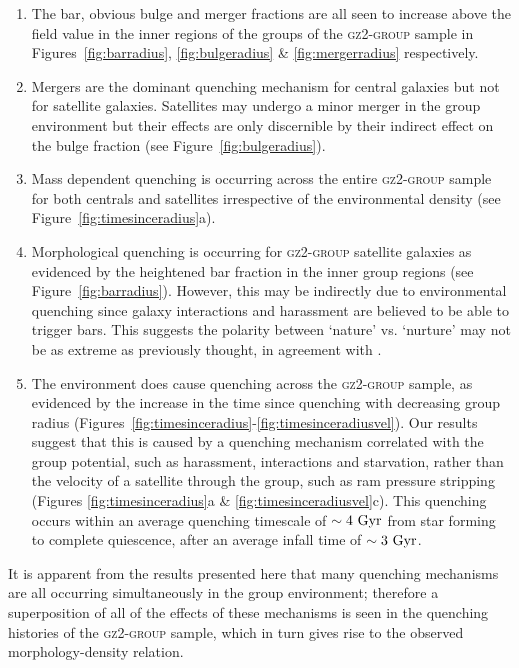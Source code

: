 \documentclass[useAMS,usenatbib]{mn2e}
\begin{document}
\begin{enumerate}
\item The bar, obvious bulge and merger fractions are all seen to increase above the field value in the inner regions of the groups of the \textsc{gz2-group} sample in Figures~\ref{fig:barradius}, \ref{fig:bulgeradius} \& \ref{fig:mergerradius} respectively.  
 
\item Mergers are the dominant quenching mechanism for central galaxies but not for satellite galaxies. Satellites may undergo a minor merger in the group environment but their effects are only discernible by their indirect effect on the bulge fraction (see Figure~\ref{fig:bulgeradius}).
 
\item Mass dependent quenching is occurring across the entire \textsc{gz2-group} sample for both centrals and satellites irrespective of the environmental density (see Figure~\ref{fig:timesinceradius}a).
 
\item Morphological quenching is occurring for \textsc{gz2-group} satellite galaxies as evidenced by the heightened bar fraction in the inner group regions (see Figure~\ref{fig:barradius}). However, this may be indirectly due to environmental quenching since galaxy interactions and harassment are believed to be able to trigger bars. This suggests the polarity between `nature' vs. `nurture' may not be as extreme as previously thought, in agreement with \cite{skibba12}. 

\item The environment does cause quenching across the \textsc{gz2-group} sample, as evidenced by the increase in the time since quenching with decreasing group radius (Figures~\ref{fig:timesinceradius}-\ref{fig:timesinceradiusvel}). Our results suggest that this is caused by a quenching mechanism correlated with the group potential, such as harassment, interactions and starvation, rather than the velocity of a satellite through the group, such as ram pressure stripping (Figures \ref{fig:timesinceradius}a \&  \ref{fig:timesinceradiusvel}c). This quenching occurs within an average quenching timescale of $\sim4~\rm{Gyr}$ from star forming to complete quiescence, after an average infall time of $\sim 3 ~\rm{Gyr}$. 
  
\end{enumerate}

It is apparent from the results presented here that many quenching mechanisms are all occurring simultaneously in the group environment; therefore a superposition of all of the effects of these mechanisms is seen in the quenching histories of the \textsc{gz2-group} sample, which in turn gives rise to the observed morphology-density relation. 
\end{document}
